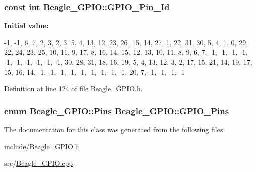 \hypertarget{class_beagle___g_p_i_o_a9a48339b54de8e6c884ddad8629a3647}{
\subsubsection[{\-G\-P\-I\-O\-\_\-\-Pin\-\_\-\-Id}]{\setlength{\rightskip}{0pt plus 5cm}const int {\bf \-Beagle\-\_\-\-G\-P\-I\-O\-::\-G\-P\-I\-O\-\_\-\-Pin\-\_\-\-Id}}}\label{class_beagle___g_p_i_o_a9a48339b54de8e6c884ddad8629a3647}
{\bfseries \-Initial value\-:}
\begin{DoxyCode}
 
{
        -1, -1,  6,  7,  2,     
         3,  2,  3,  5,  4,     
        13, 12, 23, 26, 15,     
        14, 27,  1, 22, 31,     
        30,  5,  4,  1,  0,     
        29, 22, 24, 23, 25,     
        10, 11,  9, 17,  8,     
        16, 14, 15, 12, 13,     
        10, 11,  8,  9,  6,     
         7,                     
        -1, -1, -1, -1, -1,     
        -1, -1, -1, -1, -1,     
        30, 28, 31, 18, 16,     
        19,  5,  4, 13, 12,     
         3,  2, 17, 15, 21,     
        14, 19, 17, 15, 16,     
        14, -1, -1, -1, -1,     
        -1, -1, -1, -1, -1,     
        20,  7, -1, -1, -1,     
        -1                      
}
\end{DoxyCode}


\-Definition at line 124 of file \-Beagle\-\_\-\-G\-P\-I\-O.\-h.

\hypertarget{class_beagle___g_p_i_o_ae173a49845ccc4d980cc0eb83a990418}{
\subsubsection[{\-G\-P\-I\-O\-\_\-\-Pins}]{\setlength{\rightskip}{0pt plus 5cm}enum {\bf \-Beagle\-\_\-\-G\-P\-I\-O\-::\-Pins}  {\bf \-Beagle\-\_\-\-G\-P\-I\-O\-::\-G\-P\-I\-O\-\_\-\-Pins}}}\label{class_beagle___g_p_i_o_ae173a49845ccc4d980cc0eb83a990418}


\-The documentation for this class was generated from the following files\-:\begin{DoxyCompactItemize}
\item 
include/\hyperlink{_beagle___g_p_i_o_8h}{\-Beagle\-\_\-\-G\-P\-I\-O.\-h}\item 
src/\hyperlink{_beagle___g_p_i_o_8cpp}{\-Beagle\-\_\-\-G\-P\-I\-O.\-cpp}\end{DoxyCompactItemize}
